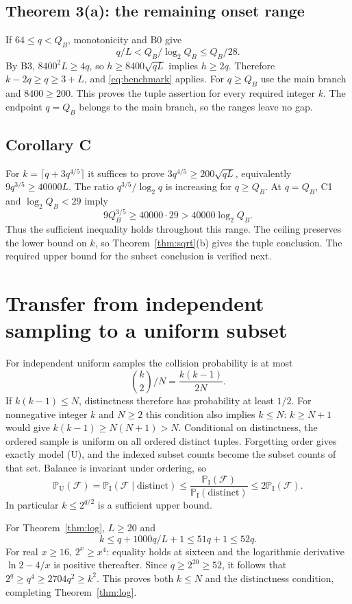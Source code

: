 \documentclass[11pt]{amsart}
\theoremstyle{remark}
\newcommand{\PI}{\mathbb P_{\mathrm I}}
\newcommand{\PU}{\mathbb P_{\mathrm U}}
\newcommand{\Fail}{\mathcal F}
\newcommand{\QB}{Q_B}
\begin{document}
\subsection{Theorem 3(a): the remaining onset range}
If $64\le q<\QB$, monotonicity and B0 give
\[
 q/L<\QB/\log_2\QB\le\QB/28.
\]
By B3, $8400^2L\ge4q$, so $h\ge8400\sqrt{qL}$ implies
$h\ge2q$. Therefore $k-2q\ge q\ge3+L$, and
\eqref{eq:benchmark} applies. For $q\ge\QB$ use the main branch
and $8400\ge200$. This proves the tuple assertion for every required
integer $k$. The endpoint $q=\QB$ belongs to the main branch, so
the ranges leave no gap.

\subsection{Corollary C}
For $k=\lceil q+3q^{4/5}\rceil$ it suffices to prove
$3q^{4/5}\ge200\sqrt{qL}$, equivalently
$9q^{3/5}\ge40000L$. The ratio $q^{3/5}/\log_2q$ is increasing
for $q\ge\QB$. At $q=\QB$, C1 and $\log_2\QB<29$ imply
\[
 9\QB^{3/5}\ge40000\cdot29>40000\log_2\QB.
\]
Thus the sufficient inequality holds throughout this range. The
ceiling preserves the lower bound on $k$, so Theorem~\ref{thm:sqrt}(b)
gives the tuple conclusion. The required upper bound for the subset
conclusion is verified next.

\section{Transfer from independent sampling to a uniform subset}
\label{sec:transfer}
For independent uniform samples the collision probability is at most
\[
 \binom{k}{2}/N=\frac{k(k-1)}{2N}.
\]
If $k(k-1)\le N$, distinctness therefore has probability at least
$1/2$. For nonnegative integer $k$ and $N\ge2$ this condition also
implies $k\le N$: $k\ge N+1$ would give $k(k-1)\ge N(N+1)>N$.
Conditional on distinctness, the ordered sample is uniform on all
ordered distinct tuples. Forgetting order gives exactly model
\textup{(U)}, and the indexed subset counts become the subset counts
of that set. Balance is invariant under ordering, so
\begin{equation}\label{eq:transfer}
 \PU(\Fail)=\PI(\Fail\mid\text{distinct})
 \le\frac{\PI(\Fail)}{\PI(\text{distinct})}
 \le2\PI(\Fail).
\end{equation}
In particular $k\le2^{q/2}$ is a sufficient upper bound.

For Theorem~\ref{thm:log}, $L\ge20$ and
\[
 k\le q+1000q/L+1\le51q+1\le52q.
\]
For real $x\ge16$, $2^x\ge x^4$: equality holds at sixteen and
the logarithmic derivative $\ln2-4/x$ is positive thereafter. Since
$q\ge2^{20}\ge52$, it follows that
$2^q\ge q^4\ge2704q^2\ge k^2$. This proves both $k\le N$
and the distinctness condition, completing Theorem~\ref{thm:log}.
\end{document}
